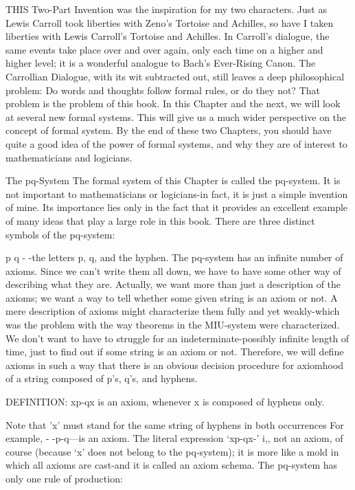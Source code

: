 THIS Two-Part Invention was the inspiration for my two characters. Just as Lewis Carroll took liberties with Zeno's Tortoise and Achilles, so have I taken liberties with Lewis Carroll's Tortoise and Achilles. In Carroll's dialogue, the same events take place over and over again, only each time on a higher and higher level; it is a wonderful analogue to Bach's Ever-Rising Canon. The Carrollian Dialogue, with its wit subtracted out, still leaves a deep philosophical problem: Do words and thoughts follow formal rules, or do they not? That problem is the problem of this book. In this Chapter and the next, we will look at several new formal systems. This will give us a much wider perspective on the concept of formal system. By the end of these two Chapters, you should have quite a good idea of the power of formal systems, and why they are of interest to mathematicians and logicians. 

The pq-System The formal system of this Chapter is called the pq-system. It is not important to mathematicians or logicians-in fact, it is just a simple invention of mine. Its importance lies only in the fact that it provides an excellent example of many ideas that play a large role in this book. There are three distinct symbols of the pq-system: 

p       q    - -the letters p, q, and the hyphen. The pq-system has an infinite number of axioms. Since we can't write them all down, we have to have some other way of describing what they are. Actually, we want more than just a description of the axioms; we want a way to tell whether some given string is an axiom or not. A mere description of axioms might characterize them fully and yet weakly-which was the problem with the way theorems in the MIU-system were characterized. We don't want to have to struggle for an indeterminate-possibly infinite length of time, just to find out if some string is an axiom or not. Therefore, we will define axioms in such a way that there is an obvious decision procedure for axiomhood of a string composed of p's, q's, and hyphens. 







DEFINITION: xp-qx is an axiom, whenever x is composed of hyphens only. 

Note that 'x' must stand for the same string of hyphens in both occurrences For example, - -p-q---is an axiom. The literal expression `xp-qx-' i,, not an axiom, of course (because `x' does not belong to the pq-system); it is more like a mold in which all axioms are cast-and it is called an axiom schema. The pq-system has only one rule of production: 

